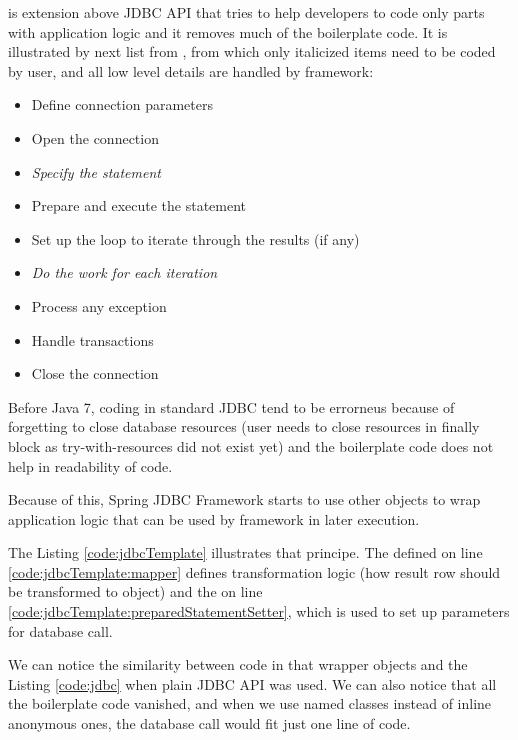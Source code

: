 \citet{SpringJDBC} is extension above JDBC API that tries to help developers to code only
parts with application logic and it removes much of the boilerplate code.
It is illustrated by next list from \citet{SpringJDBC}, from which only
italicized items need to be coded by user, and all low level details
are handled by framework:
\begin{itemize}
  \item Define connection parameters
  \item Open the connection
  \item \textit{Specify the statement}
  \item Prepare and execute the statement
  \item Set up the loop to iterate through the results (if any)
  \item \textit{Do the work for each iteration}
  \item Process any exception
  \item Handle transactions
  \item Close the connection   
\end{itemize}

Before Java 7, coding in standard JDBC tend to be errorneus because of forgetting to close
database resources (user needs to close resources in finally block as try-with-resources did not exist yet)
and the boilerplate code does not help in readability of code.

Because of this, Spring JDBC Framework starts to use other objects
to wrap application logic that can be used by framework in later execution.

The Listing \ref{code:jdbcTemplate} illustrates that principe.
The  defined on line \ref{code:jdbcTemplate:mapper} defines transformation
logic (how result row should be transformed to  object)
and the  on line \ref{code:jdbcTemplate:preparedStatementSetter},
which is used to set up parameters for database call.

We can notice the similarity between code in that wrapper objects and the Listing
\ref{code:jdbc} when plain JDBC API was used. We can also notice that all the boilerplate code vanished,
and when we use named classes instead of inline anonymous ones, the database call would fit just one line of code.







